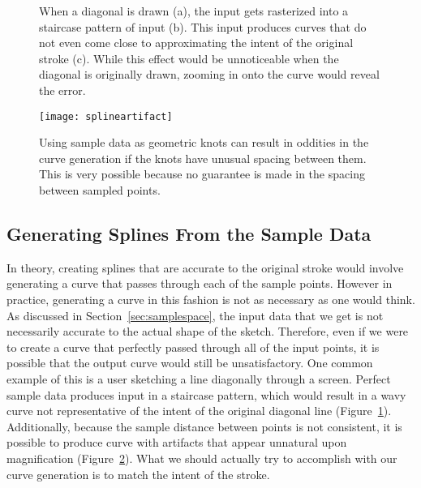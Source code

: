 \begin{figure}
\begin{center}
\end{center}
\caption[Errors in spline generation from how strokes are sampled]{When a diagonal is drawn (a), the input gets rasterized into a staircase pattern of input (b). This input produces curves that do not even come close to approximating the intent of the original stroke (c). While this effect would be unnoticeable when the diagonal is originally drawn, zooming in onto the curve would reveal the error.}
\label{fig:staircase}
\end{figure}

\begin{figure}
\begin{center}
\texttt{[image: splineartifact]}
\end{center}
\caption[An artifact in spline generation caused by oddly spaced sample points]{Using sample data as geometric knots can result in oddities in the curve generation if the knots have unusual spacing between them. This is very possible because no guarantee is made in the spacing between sampled points.}
\label{fig:splineartifact}
\end{figure}


\subsection{Generating Splines From the Sample Data}
In theory, creating splines that are accurate to the original stroke would involve generating a curve that passes through each of the sample points.
However in practice, generating a curve in this fashion is not as necessary as one would think. 
As discussed in Section~\ref{sec:samplespace}, the input data that we get is not necessarily accurate to the actual shape of the sketch.
Therefore, even if we were to create a curve that perfectly passed through all of the input points, it is possible that the output curve would still be unsatisfactory.
One common example of this is a user sketching a line diagonally through a screen.
Perfect sample data produces input in a staircase pattern, which would result in a wavy curve not representative of the intent of the original diagonal line (Figure~\ref{fig:staircase}).
Additionally, because the sample distance between points is not consistent, it is possible to produce curve with artifacts that appear unnatural upon magnification (Figure~\ref{fig:splineartifact}).
What we should actually try to accomplish with our curve generation is to match the intent of the stroke.


